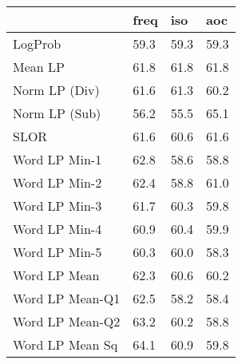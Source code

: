 \begin{tabular}{llll}
\toprule
 & freq & iso & aoc \\
\midrule
LogProb & 59.3 & 59.3 & 59.3 \\
Mean LP & 61.8 & 61.8 & 61.8 \\
Norm LP (Div) & 61.6 & 61.3 & 60.2 \\
Norm LP (Sub) & 56.2 & 55.5 & 65.1 \\
SLOR & 61.6 & 60.6 & 61.6 \\
Word LP Min-1 & 62.8 & 58.6 & 58.8 \\
Word LP Min-2 & 62.4 & 58.8 & 61.0 \\
Word LP Min-3 & 61.7 & 60.3 & 59.8 \\
Word LP Min-4 & 60.9 & 60.4 & 59.9 \\
Word LP Min-5 & 60.3 & 60.0 & 58.3 \\
Word LP Mean & 62.3 & 60.6 & 60.2 \\
Word LP Mean-Q1 & 62.5 & 58.2 & 58.4 \\
Word LP Mean-Q2 & 63.2 & 60.2 & 58.8 \\
Word LP Mean Sq & 64.1 & 60.9 & 59.8 \\
\bottomrule
\end{tabular}

